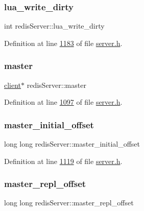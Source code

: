 \subsubsection{\texorpdfstring{lua\+\_\+write\+\_\+dirty}{lua\_write\_dirty}}
{\footnotesize\ttfamily int redis\+Server\+::lua\+\_\+write\+\_\+dirty}



Definition at line \hyperlink{server_8h_source_l01183}{1183} of file \hyperlink{server_8h_source}{server.\+h}.

\mbox{\label{structredisServer_a7c0948d60c0c65b7185a40d775049b7d}} 
\subsubsection{\texorpdfstring{master}{master}}
{\footnotesize\ttfamily \hyperlink{structclient}{client}$\ast$ redis\+Server\+::master}



Definition at line \hyperlink{server_8h_source_l01097}{1097} of file \hyperlink{server_8h_source}{server.\+h}.

\mbox{\label{structredisServer_a8e62503033f70d1b1f602b7ad86938b1}} 
\subsubsection{\texorpdfstring{master\+\_\+initial\+\_\+offset}{master\_initial\_offset}}
{\footnotesize\ttfamily long long redis\+Server\+::master\+\_\+initial\+\_\+offset}



Definition at line \hyperlink{server_8h_source_l01119}{1119} of file \hyperlink{server_8h_source}{server.\+h}.

\mbox{\label{structredisServer_aa057539130369c7783345ea82ea30364}} 
\subsubsection{\texorpdfstring{master\+\_\+repl\+\_\+offset}{master\_repl\_offset}}
{\footnotesize\ttfamily long long redis\+Server\+::master\+\_\+repl\+\_\+offset}



